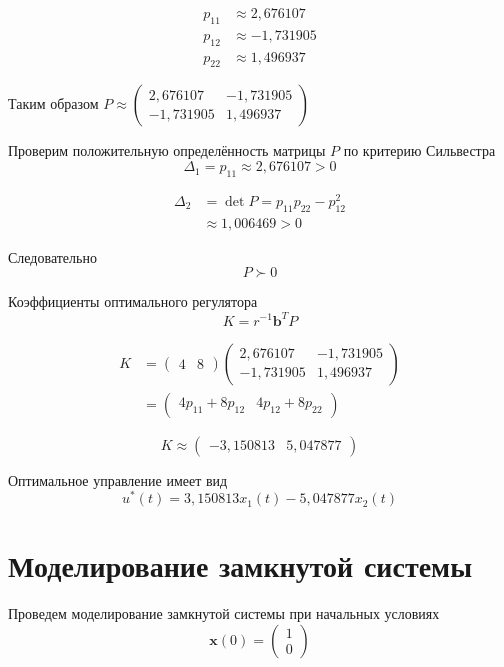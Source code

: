 \[
\begin{aligned}
p_{11}&\approx2{,}676107\\
p_{12}&\approx-1{,}731905\\
p_{22}&\approx1{,}496937
\end{aligned}
\]

Таким образом
$P\approx
\begin{pmatrix}
2{,}676107&-1{,}731905\\
-1{,}731905&1{,}496937
\end{pmatrix}$


Проверим положительную определённость матрицы $P$
по критерию Сильвестра
\[
\Delta_1=p_{11}\approx2{,}676107>0
\]

\[
\begin{aligned}
\Delta_2
&=\det P=p_{11}p_{22}-p_{12}^2\\
&\approx1{,}006469>0
\end{aligned}
\]

Следовательно
\[
P\succ0
\]

Коэффициенты оптимального регулятора
\[
K=r^{-1}\bm b^{T}P
\]

\[
\begin{aligned}
K
&=
\begin{pmatrix}4&8\end{pmatrix}
\begin{pmatrix}
2{,}676107&-1{,}731905\\
-1{,}731905&1{,}496937
\end{pmatrix}
\\[2mm]
&=
\begin{pmatrix}
4p_{11}+8p_{12}&4p_{12}+8p_{22}
\end{pmatrix}
\end{aligned}
\]

\[
K\approx\begin{pmatrix}
-3{,}150813&5{,}047877
\end{pmatrix}
\]

Оптимальное управление имеет вид
\[
u^*(t)=3{,}150813x_1(t)-5{,}047877x_2(t)
\]


\section{Моделирование замкнутой системы}

Проведем моделирование замкнутой системы при начальных условиях
\[
\bm x(0)=
\begin{pmatrix}
1\\0
\end{pmatrix}
\]

